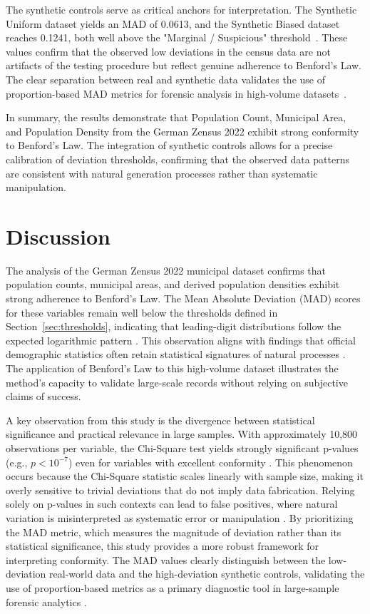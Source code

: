 \documentclass[11pt,a4paper]{article}
\begin{document}
The synthetic controls serve as critical anchors for interpretation. The Synthetic Uniform dataset yields an MAD of 0.0613, and the Synthetic Biased dataset reaches 0.1241, both well above the "Marginal / Suspicious" threshold~\cite{Druica2018BenfordsLA}. These values confirm that the observed low deviations in the census data are not artifacts of the testing procedure but reflect genuine adherence to Benford's Law. The clear separation between real and synthetic data validates the use of proportion-based MAD metrics for forensic analysis in high-volume datasets~\cite{Silva2024ANA}.

In summary, the results demonstrate that Population Count, Municipal Area, and Population Density from the German Zensus 2022 exhibit strong conformity to Benford's Law. The integration of synthetic controls allows for a precise calibration of deviation thresholds, confirming that the observed data patterns are consistent with natural generation processes rather than systematic manipulation.

\section{Discussion}
The analysis of the German Zensus 2022 municipal dataset confirms that population counts, municipal areas, and derived population densities exhibit strong adherence to Benford's Law. The Mean Absolute Deviation (MAD) scores for these variables remain well below the thresholds defined in Section~\ref{sec:thresholds}, indicating that leading-digit distributions follow the expected logarithmic pattern \cite{Druica2018BenfordsLA}. This observation aligns with findings that official demographic statistics often retain statistical signatures of natural processes \cite{Petras2025DetectingBL}. The application of Benford's Law to this high-volume dataset illustrates the method's capacity to validate large-scale records without relying on subjective claims of success.

A key observation from this study is the divergence between statistical significance and practical relevance in large samples. With approximately 10,800 observations per variable, the Chi-Square test yields strongly significant p-values (e.g., $p < 10^{-7}$) even for variables with excellent conformity \cite{Cole2019TestingTE}. This phenomenon occurs because the Chi-Square statistic scales linearly with sample size, making it overly sensitive to trivial deviations that do not imply data fabrication. Relying solely on p-values in such contexts can lead to false positives, where natural variation is misinterpreted as systematic error or manipulation \cite{Shalini2023DataQA}. By prioritizing the MAD metric, which measures the magnitude of deviation rather than its statistical significance, this study provides a more robust framework for interpreting conformity. The MAD values clearly distinguish between the low-deviation real-world data and the high-deviation synthetic controls, validating the use of proportion-based metrics as a primary diagnostic tool in large-sample forensic analytics \cite{Kossler2024SomeNI}.
\end{document}
